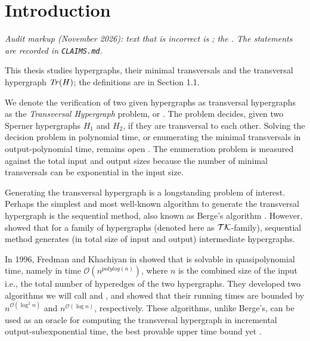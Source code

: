 \chapter{Introduction}

\noindent\textit{Audit markup (November 2026): text that is incorrect is ; the . The statements are recorded in \texttt{CLAIMS.md}.}


This thesis studies hypergraphs, their minimal transversals and the transversal hypergraph $\mathit{Tr}(H)$; the definitions are in Section 1.1.

We denote the verification of two given hypergraphs as transversal hypergraphs as the \emph{Transversal Hypergraph} problem, or \TransHyp. The problem decides, given two Sperner hypergraphs $H_1$ and $H_2$, if they are transversal to each other. Solving the decision problem in polynomial time, or enumerating the minimal transversals in output-polynomial time, remains open \cite{EMG08}. The enumeration problem is measured against the total input and output sizes because the number of minimal transversals can be exponential in the input size.

Generating the transversal hypergraph is a longstanding problem of interest. Perhaps the simplest and most well-known algorithm to generate the transversal hypergraph is the sequential method, also known as Berge's algorithm \cite{Ber87}. However, \cite{Tak08} showed that for a family of hypergraphs (denoted here as $\mathcal{TK}$-family), sequential method generates   (in total size of input and output) intermediate hypergraphs.

In 1996, Fredman and Khachiyan in \cite{FK96} showed that \TransHyp{} is solvable in quasipolynomial time, namely in time $\mathcal{O}(n^{polylog(n)})$, where $n$ is the combined size of the input i.e., the total number of hyperedges of the two hypergraphs. They developed two algorithms we will call \FKA{} and \FKB, and showed that their running times are bounded by $n^{\mathcal{O}(\log^2 n)}$ and $n^{\mathcal{O}(\log n)}$, respectively. These algorithms, unlike Berge's, can be used as an oracle for computing the transversal hypergraph in incremental output-subexponential time, the best provable upper time bound yet \cite{CKP20}.

